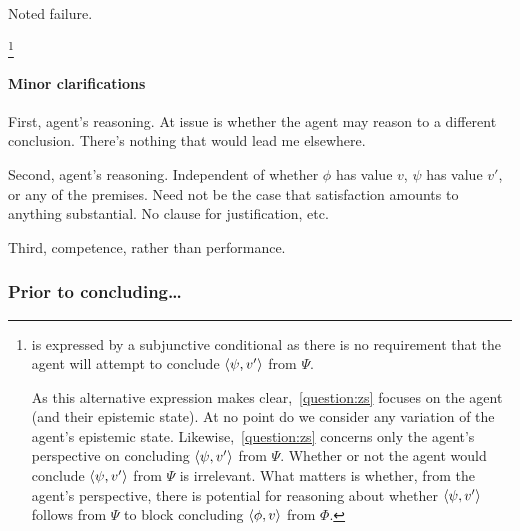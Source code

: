 \begin{note}
  Noted failure.
\end{note}

\footnote{
 { \color{blue} \requ{} } is expressed by a subjunctive conditional as there is no requirement that the agent will attempt to conclude \(\langle \psi, v' \rangle\) from \(\Psi\).

  \color{red}
  As this alternative expression makes clear,~\autoref{question:zs} focuses on the agent (and their epistemic state).
  At no point do we consider any variation of the agent's epistemic state.
  Likewise,~\autoref{question:zs} concerns only the agent's perspective on concluding \(\langle \psi, v' \rangle\) from \(\Psi\).
  Whether or not the agent would conclude \(\langle \psi, v' \rangle\) from \(\Psi\) is irrelevant.
  What matters is whether, from the agent's perspective, there is potential for reasoning about whether \(\langle \psi, v' \rangle\) follows from \(\Psi\) to block concluding \(\langle \phi, v \rangle\) from \(\Phi\).
}

\paragraph*{Minor clarifications}

\begin{note}
  First, agent's reasoning.
  At issue is whether the agent may reason to a different conclusion.
  There's nothing that would lead me elsewhere.

  Second, agent's reasoning.
  Independent of whether \(\phi\) has value \(v\), \(\psi\) has value \(v'\), or any of the premises.
  Need not be the case that satisfaction amounts to anything substantial.
  No clause for justification, etc.

  Third, competence, rather than performance.
\end{note}

\subsubsection{Prior to concluding\dots}

